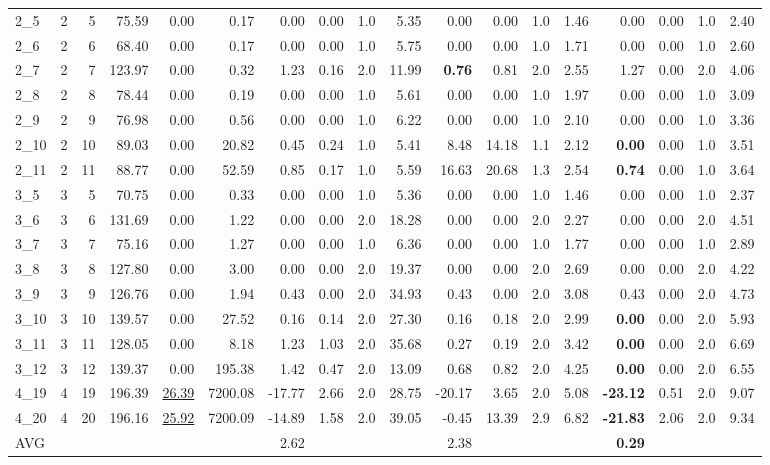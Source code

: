 \begin{table*}[!h]
\begin{threeparttable}
\begin{tabular}{lcrrrrrrrrrrrrrrrr}
			\midrule
			2\_5&2&5&75.59 &0.00&0.17 &0.00&0.00 &1.0 &5.35 &0.00&0.00 &1.0 &1.46 &0.00&0.00 &1.0 &2.40 \\
			2\_6&2&6&68.40 &0.00&0.17 &0.00&0.00 &1.0 &5.75 &0.00&0.00 &1.0 &1.71 &0.00&0.00 &1.0 &2.60 \\
			2\_7&2&7&123.97 &0.00&0.32 &1.23&0.16 &2.0 &11.99 &\textbf{0.76}&0.81 &2.0 &2.55 &1.27&0.00 &2.0 &4.06 \\
			2\_8&2&8&78.44 &0.00&0.19 &0.00&0.00 &1.0 &5.61 &0.00&0.00 &1.0 &1.97 &0.00&0.00 &1.0 &3.09 \\
			2\_9&2&9&76.98 &0.00&0.56 &0.00&0.00 &1.0 &6.22 &0.00&0.00 &1.0 &2.10 &0.00&0.00 &1.0 &3.36 \\
			2\_10&2&10&89.03 &0.00&20.82 &0.45&0.24 &1.0 &5.41 &8.48&14.18 &1.1 &2.12 &\textbf{0.00}&0.00 &1.0 &3.51 \\
			2\_11&2&11&88.77 &0.00&52.59 &0.85&0.17 &1.0 &5.59 &16.63&20.68 &1.3 &2.54 &\textbf{0.74}&0.00 &1.0 &3.64 \\
			3\_5&3&5&70.75 &0.00&0.33 &0.00&0.00 &1.0 &5.36 &0.00&0.00 &1.0 &1.46 &0.00&0.00 &1.0 &2.37 \\
			3\_6&3&6&131.69 &0.00&1.22 &0.00&0.00 &2.0 &18.28 &0.00&0.00 &2.0 &2.27 &0.00&0.00 &2.0 &4.51 \\
			3\_7&3&7&75.16 &0.00&1.27 &0.00&0.00 &1.0 &6.36 &0.00&0.00 &1.0 &1.77 &0.00&0.00 &1.0 &2.89 \\
			3\_8&3&8&127.80 &0.00&3.00 &0.00&0.00 &2.0 &19.37 &0.00&0.00 &2.0 &2.69 &0.00&0.00 &2.0 &4.22 \\
			3\_9&3&9&126.76 &0.00&1.94 &0.43&0.00 &2.0 &34.93 &0.43&0.00 &2.0 &3.08 &0.43&0.00 &2.0 &4.73 \\
			3\_10&3&10&139.57 &0.00&27.52 &0.16&0.14 &2.0 &27.30 &0.16&0.18 &2.0 &2.99 &\textbf{0.00}&0.00 &2.0 &5.93 \\
			3\_11&3&11&128.05 &0.00&8.18 &1.23&1.03 &2.0 &35.68 &0.27&0.19 &2.0 &3.42 &\textbf{0.00}&0.00 &2.0 &6.69 \\
			3\_12&3&12&139.37 &0.00&195.38 &1.42&0.47 &2.0 &13.09 &0.68&0.82 &2.0 &4.25 &\textbf{0.00}&0.00 &2.0 &6.55 \\
			4\_19&4&19&196.39 &\underline{26.39} &7200.08 &-17.77&2.66 &2.0 &28.75 &-20.17&3.65 &2.0 &5.08 &\textbf{-23.12}&0.51 &2.0 &9.07 \\
			4\_20&4&20&196.16 &\underline{25.92} &7200.09 &-14.89&1.58 &2.0 &39.05 &-0.45&13.39 &2.9 &6.82 &\textbf{-21.83}&2.06 &2.0 &9.34 \\
			AVG&&&&&&2.62&&&&2.38&&&&\textbf{0.29}&&&\\

\end{tabular}
\end{threeparttable}
\end{table*}

